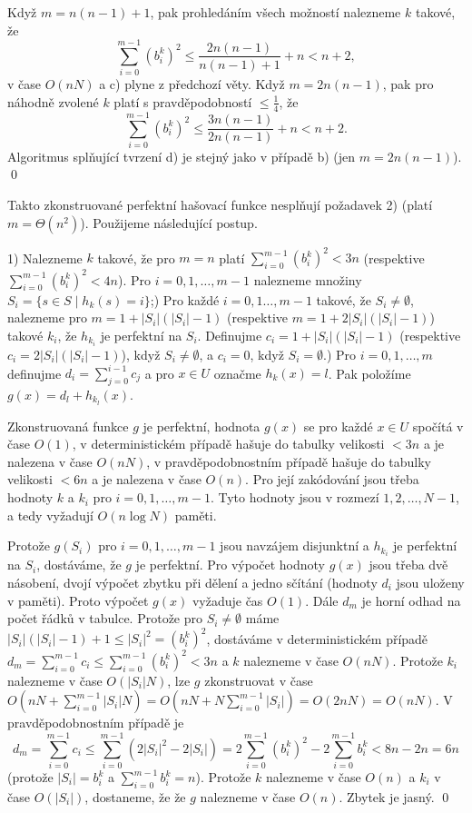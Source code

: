 \documentclass[a4paper,12pt]{article}
\begin{document}
Když $m=n(n-1)+1$, pak prohledáním všech možností 
nalezne\-me $k$ takové, že 
$$\sum_{i=0}^{m-1}(b_i^k)^2\le\frac {2n(n-1)}{n(n-1)+1}+n<n+2,$$
 v 
čase $O(nN)$ a c) plyne z předchozí věty. Když 
$m=2n(n-1)$, pak pro náhodně zvolené $k$ platí s 
pravděpodobností $\le\frac 14$, že 
$$\sum_{i=0}^{m-1}(b_i^k)^2\le\frac {3n(n-1)}{2n(n-1)}+n<n+2.$$
Algoritmus splňující tvrzení d) je stejný jako 
v případě b) (jen $m=2n(n-1)$). \qed
\enddemo

Takto zkonstruované perfektní hašovací funkce 
nesplňují poža\-davek 2) (platí $m=\Theta (n^2)$).  Použijeme následující 
postup. 

1) Nalezneme $k$ takové, že pro $m=n$ platí 
$\sum_{i=0}^{m-1}(b_i^k)^2<3n$ (respektive $\sum_{i=0}^{m-1}(b_i^
k)^2<4n$).  Pro 
$i=0,1,\dots,m-1$ nalezneme množiny 
$S_i=\{s\in S\mid h_k(s)=i\}$;) Pro každé $i=0,1\dots,m-1$ takové, že $S_i\ne\emptyset$, 
nalezneme pro $m=1+|S_i|(|S_i|-1)$ (respektive $m=1+2|S_i|(|S_i|-
1)$) 
takové $k_i$, že $h_{k_i}$ je perfektní na $S_i$. Definujme 
$c_i=1+|S_i|(|S_i|-1)$ (respektive $c_i=2|S_i|(|S_i|-1)$), když 
$S_i\ne\emptyset$, a $c_i=0$, když 
$S_i=\emptyset$.) Pro $i=0,1,\dots,m$ definujme $d_i=\sum_{j=0}^{i-1}c_j$ a pro $
x\in U$ 
označme $h_k(x)=l$. Pak položíme $g(x)=d_l+h_{k_l}(x)$.

Zkonstruovaná funkce $g$ je perfektní, 
hodnota $g(x)$ se pro každé $x\in U$ spočítá v čase $
O(1)$, 
v deterministickém přípa\-dě hašuje do tabulky velikosti 
$<3n$ a je nalezena v čase $O(nN)$, v pravděpodobnostním 
přípa\-dě hašuje do tabulky velikosti $<6n$ a je nalezena 
v čase $O(n)$. Pro její zak\'odování jsou třeba hodnoty $
k$ a 
$k_i$ pro $i=0,1,\dots,m-1$. Tyto hodnoty jsou v rozmezí 
$1,2,\dots,N-1$, a tedy vyžadují $O(n\log N)$ paměti.
\endproclaim

Protože $g(S_i)$ pro $i=0,1,\dots,m-1$ 
jsou navzájem disjunktní a $h_{k_i}$ je perfektní na $S_
i$, 
dostáváme, že $g$ je perfektní. Pro výpočet hodnoty $
g(x)$ 
jsou třeba dvě násobení, dvojí výpočet zbytku při 
dělení a jedno sčítání (hodnoty $d_i$ jsou uloženy v 
paměti). Proto výpočet $g(x)$ vyžaduje čas $O(1)$. Dále 
$d_m$ je horní odhad na počet řádků v tabulce. 
Protože pro $S_i\ne\emptyset$ máme $|S_i|(|S_i|-1)+1\le |S_
i|^2=(b_i^k)^2$, 
dostáváme v deterministickém případě 
$d_m=\sum_{i=0}^{m-1}c_i\le\sum_{i=0}^{m-1}(b_i^k)^2<3n$ a $k$ nalezneme v čase 
$O(nN)$. Protože $k_i$ nalezneme v čase $O(|S_i|N)$, lze $g$ 
zkonstruovat v čase 
$O(nN+\sum_{i=0}^{m-1}|S_i|N)=O(nN+N\sum_{i=0}^{m-1}|S_i|)=O(2nN)
=O(nN)$. 
V pravděpodob\-nostním případě je 
$$d_m=\sum_{i=0}^{m-1}c_i\le\sum_{i=0}^{m-1}(2|S_i|^2-2|S_i|)=2\sum_{
i=0}^{m-1}(b_i^k)^2-2\sum_{i=0}^{m-1}b_i^k<8n-2n=6n$$
(protože $|S_i|=b_i^k$ a $\sum_{i=0}^{m-1}b_i^k=n$). Protože $
k$ nalezneme v čase $O(n)$ a $k_i$ v čase $O(|S_i|)$, dostaneme, že 
že $g$ nalezneme v čase $O(n)$. Zbytek je jasný. \qed
\enddemo
\end{document}
